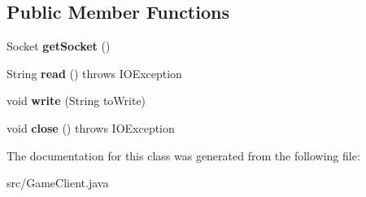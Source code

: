 \subsection*{Public Member Functions}
\begin{DoxyCompactItemize}
\item 
Socket {\bfseries get\+Socket} ()\hypertarget{classGameClient_aecd4af8ab8269224d8a64f8dd742727b}{}\label{classGameClient_aecd4af8ab8269224d8a64f8dd742727b}

\item 
String {\bfseries read} ()  throws I\+O\+Exception \hypertarget{classGameClient_adabd0d577d18af7d8d740a40c8ba071b}{}\label{classGameClient_adabd0d577d18af7d8d740a40c8ba071b}

\item 
void {\bfseries write} (String to\+Write)\hypertarget{classGameClient_a553f6df87097e02fd5b35e96e5005e7a}{}\label{classGameClient_a553f6df87097e02fd5b35e96e5005e7a}

\item 
void {\bfseries close} ()  throws I\+O\+Exception \hypertarget{classGameClient_a7f4a27d2857721b96ef4be91e5b22c87}{}\label{classGameClient_a7f4a27d2857721b96ef4be91e5b22c87}

\end{DoxyCompactItemize}


The documentation for this class was generated from the following file\+:\begin{DoxyCompactItemize}
\item 
src/Game\+Client.\+java\end{DoxyCompactItemize}

